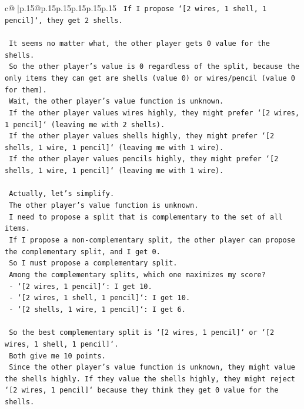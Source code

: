 \documentclass{article}
\begin{document}
{\begin{supertabular}{c@{$\;$}|p{.15\linewidth}@{}p{.15\linewidth}p{.15\linewidth}p{.15\linewidth}p{.15\linewidth}p{.15\linewidth}}
{{{\texttt{    If I propose `{[}2 wires, 1 shell, 1 pencil{]}`, they get 2 shells.} \\
\\ 
\texttt{    It seems no matter what, the other player gets 0 value for the shells.} \\
\texttt{    So the other player's value is 0 regardless of the split, because the only items they can get are shells (value 0) or wires/pencil (value 0 for them).} \\
\texttt{    Wait, the other player's value function is unknown.} \\
\texttt{    If the other player values wires highly, they might prefer `{[}2 wires, 1 pencil{]}` (leaving me with 2 shells).} \\
\texttt{    If the other player values shells highly, they might prefer `{[}2 shells, 1 wire, 1 pencil{]}` (leaving me with 1 wire).} \\
\texttt{    If the other player values pencils highly, they might prefer `{[}2 shells, 1 wire, 1 pencil{]}` (leaving me with 1 wire).} \\
\\ 
\texttt{    Actually, let's simplify.} \\
\texttt{    The other player's value function is unknown.} \\
\texttt{    I need to propose a split that is complementary to the set of all items.} \\
\texttt{    If I propose a non{-}complementary split, the other player can propose the complementary split, and I get 0.} \\
\texttt{    So I must propose a complementary split.} \\
\texttt{    Among the complementary splits, which one maximizes my score?} \\
\texttt{    {-}   `{[}2 wires, 1 pencil{]}`: I get 10.} \\
\texttt{    {-}   `{[}2 wires, 1 shell, 1 pencil{]}`: I get 10.} \\
\texttt{    {-}   `{[}2 shells, 1 wire, 1 pencil{]}`: I get 6.} \\
\\ 
\texttt{    So the best complementary split is `{[}2 wires, 1 pencil{]}` or `{[}2 wires, 1 shell, 1 pencil{]}`.} \\
\texttt{    Both give me 10 points.} \\
\texttt{    Since the other player's value function is unknown, they might value the shells highly. If they value the shells highly, they might reject `{[}2 wires, 1 pencil{]}` because they think they get 0 value for the shells.} \\
}}}
\end{supertabular}}
\end{document}
